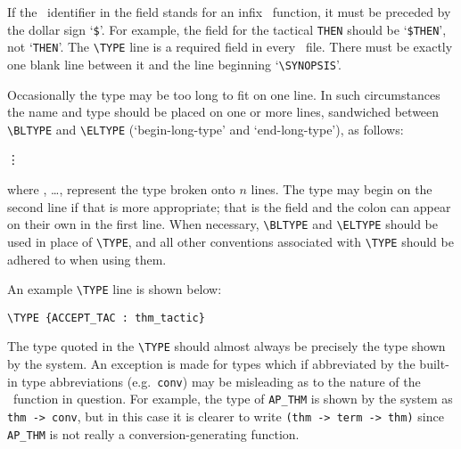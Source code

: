 \noindent If the \ML\ identifier in the  field stands for an infix
\ML\ function, it must be preceded by the dollar sign `{\small\verb!$!}'.  For
example, the  field for the tactical {\small\verb!THEN!} should be
`{\small\verb!$THEN!}', not `{\small\verb!THEN!}'.  The {\small\verb!\TYPE!}
line is  a required field in every \doc\ file.  There must be exactly one
blank line between it and the line beginning `{\small\verb!\SYNOPSIS!}'.

Occasionally the type may be too long to fit on one line. In such circumstances
the name and type should be placed on one or more lines, sandwiched between
{\small\verb!\BLTYPE!} and {\small\verb!\ELTYPE!} (`begin-long-type' and
`end-long-type'), as follows:

\medskip
\noindent\qquad{\small\verb!\BLTYPE!}
\par\noindent{}
\par\noindent{}
\par\noindent\qquad\vdots
\par\noindent{}
\par\noindent\qquad{\small\verb!\ELTYPE!}
\medskip

\noindent
where , \ldots,  represent the type broken onto
$n$ lines. The type may begin on the second line if that is more appropriate;
that is the  field and the colon can appear on their own in the
first line. When necessary, {\small\verb!\BLTYPE!} and {\small\verb!\ELTYPE!}
should be used in place of {\small\verb!\TYPE!}, and all other conventions
associated with {\small\verb!\TYPE!} should be adhered to when using them.

An example {\small\verb!\TYPE!} line is shown below:

\smallskip

\begin{boxed}\begin{verbatim}
\TYPE {ACCEPT_TAC : thm_tactic}
\end{verbatim}\end{boxed}

\smallskip

The type quoted in the {\small\verb!\TYPE!} should almost always be precisely
the type shown by the system.  An exception is made for types which if
abbreviated by the built-in type abbreviations (e.g.\ {\small\verb!conv!}) may
be misleading as to the nature of the \ML\ function in question.  For example,
the type of {\small\verb!AP_THM!} is shown by the system as
{\small\verb!thm -> conv!}, but in this case it is clearer to write
{\small\verb!(thm -> term -> thm)!} since {\small\verb!AP_THM!} is not really a
conversion-generating function.

